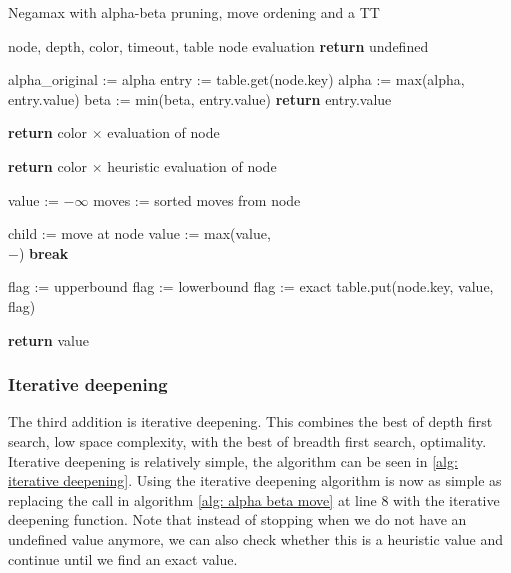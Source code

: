 \documentclass[a4paper]{article}
\begin{document}
\begin{algorithm}
	\caption{Negamax with alpha-beta pruning, move ordening and a TT}
	\label{alg: insane}
	\begin{algorithmic}[1]
		\Require node, depth, color, timeout, table
		\Ensure node evaluation
				\State \textbf{return} undefined
			\EndIf

			\State alpha\_original := alpha
			\State entry := table.get(node.key)
					\State alpha := max(alpha, entry.value)
					\State beta := min(beta, entry.value)
				\Else
					\State \textbf{return} entry.value
				\EndIf
			\EndIf

				\State \textbf{return} color $\times$ evaluation of node
			\EndIf

				\State \textbf{return} color $\times$ heuristic evaluation of node
			\EndIf

			\State value := $-\infty$
			\State moves := sorted moves from node

				\State child := move at node
				\State value := max(value, \\\hspace{2cm}$-$)
					\State \textbf{break}
				\EndIf
			\EndFor

					\State flag := upperbound
					\State flag := lowerbound
				\Else
					\State flag := exact
				\EndIf
				\State table.put(node.key, value, flag)
			\EndIf

			\State \textbf{return} value
		\EndFunction
	\end{algorithmic}
\end{algorithm}

\subsubsection*{Iterative deepening}
The third addition is iterative deepening. This combines the best of depth
first search, low space complexity, with the best of breadth first search,
optimality. Iterative deepening is relatively simple, the algorithm can be seen
in \ref{alg: iterative deepening}. Using the iterative deepening algorithm is
now as simple as replacing the call in algorithm \ref{alg: alpha beta move} at
line 8 with the iterative deepening function. Note that instead of stopping
when we do not have an undefined value anymore, we can also check whether this
is a heuristic value and continue until we find an exact value.
\end{document}
